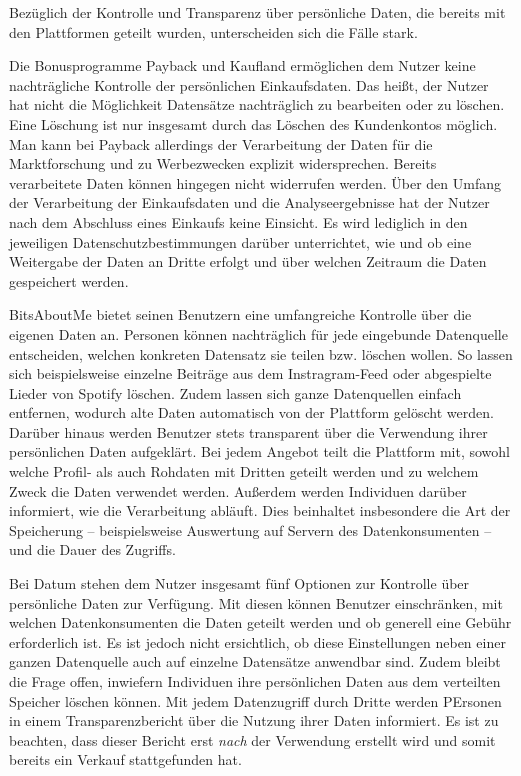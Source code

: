 \noindent Bezüglich der Kontrolle und Transparenz über persönliche Daten, die bereits mit den Plattformen geteilt wurden, unterscheiden sich die Fälle stark. \newline

\noindent Die Bonusprogramme Payback und Kaufland ermöglichen dem Nutzer keine nachträgliche Kontrolle der persönlichen Einkaufsdaten. Das heißt, der Nutzer hat nicht die Möglichkeit Datensätze nachträglich zu bearbeiten oder zu löschen. Eine Löschung ist nur insgesamt durch das Löschen des Kundenkontos möglich. Man kann bei Payback allerdings der Verarbeitung der Daten für die Marktforschung und zu Werbezwecken explizit widersprechen. Bereits verarbeitete Daten können hingegen nicht widerrufen werden. Über den Umfang der Verarbeitung der Einkaufsdaten und die Analyseergebnisse hat der Nutzer nach dem Abschluss eines Einkaufs keine Einsicht. Es wird lediglich in den jeweiligen Datenschutzbestimmungen darüber unterrichtet, wie und ob eine Weitergabe der Daten an Dritte erfolgt und über welchen Zeitraum die Daten gespeichert werden. \newline

\noindent BitsAboutMe bietet seinen Benutzern eine umfangreiche Kontrolle über die eigenen Daten an. Personen können nachträglich für jede eingebunde Datenquelle entscheiden, welchen konkreten Datensatz sie teilen bzw. löschen wollen. So lassen sich beispielsweise einzelne Beiträge aus dem Instragram-Feed oder abgespielte Lieder von Spotify löschen. Zudem lassen sich ganze Datenquellen einfach entfernen, wodurch alte Daten automatisch von der Plattform gelöscht werden. Darüber hinaus werden Benutzer stets transparent über die Verwendung ihrer persönlichen Daten aufgeklärt. Bei jedem Angebot teilt die Plattform mit, sowohl welche Profil- als auch Rohdaten mit Dritten geteilt werden und zu welchem Zweck die Daten verwendet werden. Außerdem werden Individuen darüber informiert, wie die Verarbeitung abläuft. Dies beinhaltet insbesondere die Art der Speicherung -- beispielsweise Auswertung auf Servern des Datenkonsumenten -- und die Dauer des Zugriffs. \newline

\noindent Bei Datum stehen dem Nutzer insgesamt fünf Optionen zur Kontrolle über persönliche Daten zur Verfügung. Mit diesen können Benutzer einschränken, mit welchen Datenkonsumenten die Daten geteilt werden und ob generell eine Gebühr erforderlich ist. Es ist jedoch nicht ersichtlich, ob diese Einstellungen neben einer ganzen Datenquelle auch auf einzelne Datensätze anwendbar sind. Zudem bleibt die Frage offen, inwiefern Individuen ihre persönlichen Daten aus dem verteilten Speicher löschen können. Mit jedem Datenzugriff durch Dritte werden PErsonen in einem Transparenzbericht über die Nutzung ihrer Daten informiert. Es ist zu beachten, dass dieser Bericht erst \textit{nach} der Verwendung erstellt wird und somit bereits ein Verkauf stattgefunden hat. \newline


